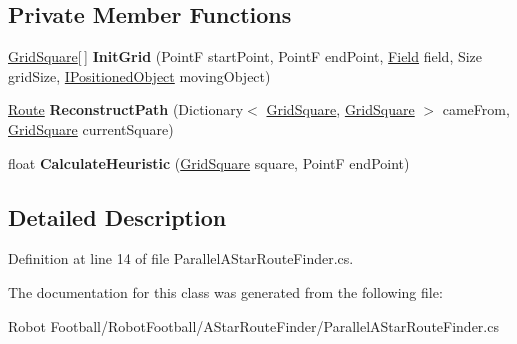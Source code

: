 \subsection*{Private Member Functions}
\begin{DoxyCompactItemize}
\item 
\hypertarget{class_route_finders_1_1_parallel_a_star_route_finder_a1a15c25290f9550fad29459914c7316d}{\hyperlink{class_route_finders_1_1_grid_square}{Grid\-Square}\mbox{[}$\,$\mbox{]} {\bfseries Init\-Grid} (Point\-F start\-Point, Point\-F end\-Point, \hyperlink{class_robot_football_core_1_1_objects_1_1_field}{Field} field, Size grid\-Size, \hyperlink{interface_robot_football_core_1_1_interfaces_1_1_i_positioned_object}{I\-Positioned\-Object} moving\-Object)}\label{class_route_finders_1_1_parallel_a_star_route_finder_a1a15c25290f9550fad29459914c7316d}

\item 
\hypertarget{class_route_finders_1_1_parallel_a_star_route_finder_adabd597a6c14e12bab7a578be5964cc5}{\hyperlink{class_robot_football_core_1_1_route_objects_1_1_route}{Route} {\bfseries Reconstruct\-Path} (Dictionary$<$ \hyperlink{class_route_finders_1_1_grid_square}{Grid\-Square}, \hyperlink{class_route_finders_1_1_grid_square}{Grid\-Square} $>$ came\-From, \hyperlink{class_route_finders_1_1_grid_square}{Grid\-Square} current\-Square)}\label{class_route_finders_1_1_parallel_a_star_route_finder_adabd597a6c14e12bab7a578be5964cc5}

\item 
\hypertarget{class_route_finders_1_1_parallel_a_star_route_finder_a8887af9f61ebd5ccb56ca122fe47b9a0}{float {\bfseries Calculate\-Heuristic} (\hyperlink{class_route_finders_1_1_grid_square}{Grid\-Square} square, Point\-F end\-Point)}\label{class_route_finders_1_1_parallel_a_star_route_finder_a8887af9f61ebd5ccb56ca122fe47b9a0}

\end{DoxyCompactItemize}


\subsection{Detailed Description}


Definition at line 14 of file Parallel\-A\-Star\-Route\-Finder.\-cs.



The documentation for this class was generated from the following file\-:\begin{DoxyCompactItemize}
\item 
Robot Football/\-Robot\-Football/\-A\-Star\-Route\-Finder/Parallel\-A\-Star\-Route\-Finder.\-cs\end{DoxyCompactItemize}
